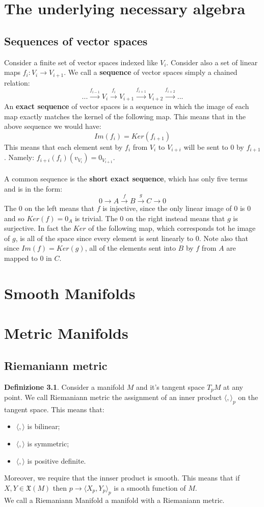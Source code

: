 \documentclass[12pt,a4paper]{report}
\theoremstyle{definition}
\newtheorem{Def}{Definizione}[chapter]
\theoremstyle{Theorem}
\theoremstyle{definition}
\theoremstyle{definition}
\theoremstyle{definition}
\begin{document}
	\chapter{The underlying necessary algebra}
	\section{Sequences of vector spaces}
		Consider a finite set of vector spaces indexed like $V_i$. Consider also a set of linear maps $f_i:V_i\rightarrow V_{i+1}$. We call a \textbf{sequence} of vector spaces simply a chained relation:
		$$...\xrightarrow{f_{i-1}} V_i\xrightarrow{f_i}V_{i+1}\xrightarrow{f_{i+1}}V_{i+2}\xrightarrow{f_{i+2}}...$$
		An \textbf{exact sequence} of vector spaces is a sequence in which the image of each map exactly matches the kernel of the following map. This means that in the above sequence we would have:
		$$Im(f_i)=Ker(f_{i+1})$$
		This means that each element sent by $f_i$ from $V_i$ to $V_{i+i}$ will be sent to $0$ by $f_{i+1}$. Namely: $f_{i+i}(f_i)(v_{V_i})=0_{V_{i+1}}$.\\
		\\
		A common sequence is the \textbf{short exact sequence}, which has only five terms and is in the form:
		$$0\rightarrow A\xrightarrow{f}B\xrightarrow{g}C\rightarrow0$$
		The 0 on the left means that $f$ is injective, since the only linear image of $0$ is 0 and so $Ker(f)=0_A$ is trivial. The 0 on the right instead means that $g$ is surjective. In fact the $Ker$ of the following map, which corresponds tot he image of $g$, is all of the space since every element is sent linearly to 0. Note also that since $Im(f)=Ker(g)$, all of the elements sent into $B$ by $f$ from $A$ are mapped to 0 in $C$.
	\chapter{Smooth Manifolds}
	\chapter{Metric Manifolds}
	\section{Riemaniann metric}
	\begin{Def}\label{Def_4.1}
		Consider a manifold $M$ and it's tangent space $T_pM$ at any point. We call Riemaniann metric the assignment of an inner product $\langle,\rangle_p$ on the tangent space. This means that:
		\begin{itemize}
			\item $\langle,\rangle$ is bilinear;
			\item $\langle,\rangle$ is symmetric;
			\item $\langle,\rangle$ is positive definite.
		\end{itemize}
		Moreover, we require that the innser product is smooth. This means that if $X,Y\in\mathfrak{X}(M)$ then $p\rightarrow\langle X_p,Y_p\rangle_p$ is a smooth function of $M$.\\
		We call a Riemaniann Manifold a manifold with a Riemaniann metric.
	\end{Def}
\end{document}
